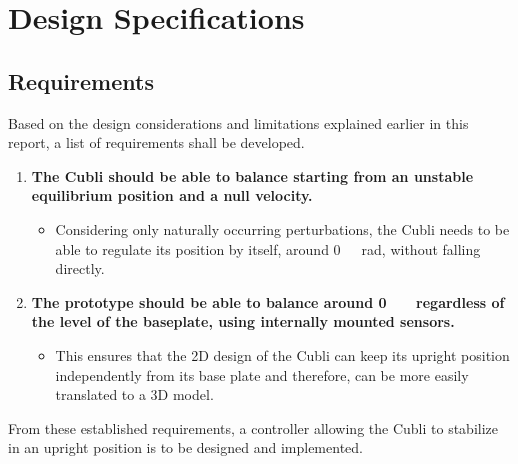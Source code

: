 \chapter{Design Specifications}\label{chap:specifications}


\section{Requirements}\label{requirements}
Based on the design considerations and limitations explained earlier in this report, a list of requirements shall be developed.
%
\begin{enumerate}
\item \textbf{The Cubli should be able to balance starting from an unstable equilibrium position and a null velocity.}
  \begin{itemize}
  \item[] Considering only naturally occurring perturbations, the Cubli needs to be able to regulate its position by itself, around \si{0\ rad}, without falling directly.
  \end{itemize}

\item \textbf{The prototype should be able to balance around \si{0\ \rad} regardless of the level of the baseplate, using internally mounted sensors.}  
  \begin{itemize}
  \item[] This ensures that the 2D design of the Cubli can keep its upright position independently from its base plate and therefore, can be more easily translated to a 3D model.
  \end{itemize}
%  
%  	
\end{enumerate}
%
From these established requirements, a controller allowing the Cubli to stabilize in an upright position is to be designed and implemented.

